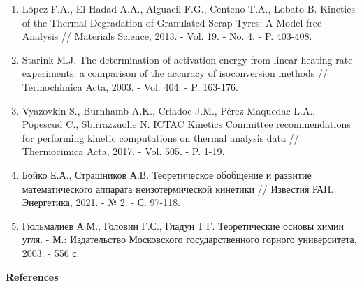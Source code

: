 \begin{enumerate}
\item
López F.A., El Hadad A.A., Alguacil F.G., Centeno T.A., Lobato B.
Kinetics of the Thermal Degradation of Granulated Scrap Tyres: A
Model-free Analysis // Materials Science, 2013. - Vol. 19. - No. 4. -
P. 403-408.

\item
Starink M.J. The determination of activation energy from linear
heating rate experiments: a comparison of the accuracy of isoconversion
methods // Termochimica Acta, 2003. - Vol. 404. - P. 163-176.

\item
Vyazovkin S., Burnhamb A.K., Criadoc J.M., Pérez-Maquedac L.A.,
Popescud C., Sbirrazzuolie N. ICTAC Kinetics Committee recommendations
for performing kinetic computations on thermal analysis data //
Thermocimica Acta, 2017. - Vol. 505. - P. 1-19.

\item
Бойко Е.А., Страшников А.В. Теоретическое обобщение и развитие
математического аппарата неизотермической кинетики // Известия РАН.
Энергетика, 2021. - № 2. - С. 97-118.

\item
Гюльмалиев А.М., Головин Г.С., Гладун Т.Г. Теоретические основы
химии угля. - М.: Издательство Московского государственного горного
университета, 2003. - 556 с.
\end{enumerate}

\begin{center}
{\bfseries References}
\end{center}


